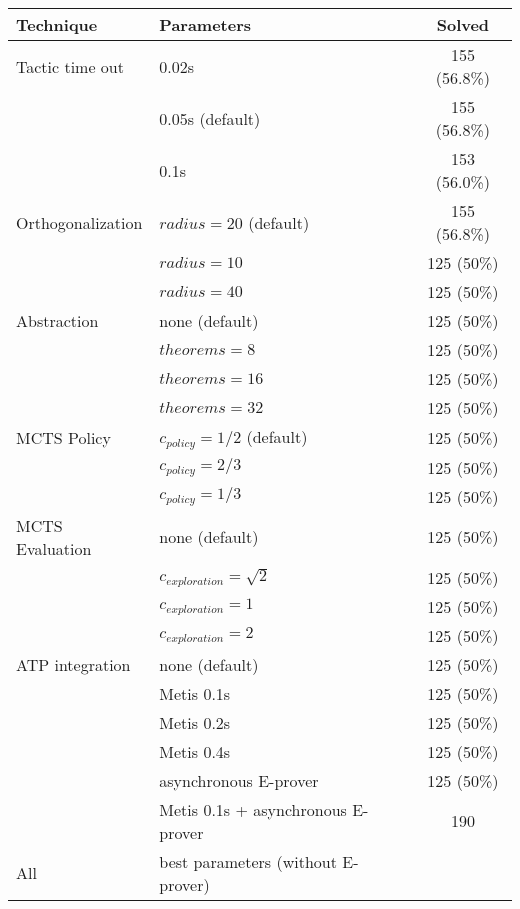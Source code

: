 \documentclass[runningheads,a4paper,draft]{svjour3}
\def\eprover{\textsf{E-prover}\xspace}
\def\metis{\textsf{Metis}\xspace}
\newcommand{\ra}[1]{\renewcommand{\arraystretch}{#1}}
\begin{document}
\begin{table}[ht]
\centering\ra{1.3}
\small
\begin{tabular}{llc}
\toprule
 Technique & Parameters & Solved \\
\midrule
Tactic time out & 0.02s & 155 (56.8\%)\\
                & 0.05s (default) & 155 (56.8\%)\\
                & 0.1s & 153 (56.0\%)\\
\midrule
Orthogonalization & $radius = 20$ (default) & 155 (56.8\%)\\ 
                  & $radius = 10$ & 125 (50\%)\\
                  & $radius = 40$ & 125 (50\%)\\
\midrule
Abstraction       & none (default) & 125 (50\%)\\
                  & $theorems = 8$ & 125 (50\%)\\
                  & $theorems = 16$ & 125 (50\%)\\
                  & $theorems = 32$ & 125 (50\%)\\
\midrule
MCTS Policy & $c_{policy} = 1/2$ (default) & 125 (50\%)\\
            & $c_{policy} = 2/3$ & 125 (50\%)\\
            & $c_{policy} = 1/3$ & 125 (50\%)\\
\midrule
MCTS Evaluation & none (default) & 125 (50\%) \\
           & $c_{exploration} =\sqrt{2}$ & 125 (50\%)\\ 
           & $c_{exploration} = 1$ & 125 (50\%)\\ 
           & $c_{exploration} = 2$ & 125 (50\%)\\ 
\midrule
ATP integration & none (default) & 125 (50\%)\\
                & \metis 0.1s & 125 (50\%)\\
                & \metis 0.2s & 125 (50\%)\\
                & \metis 0.4s & 125 (50\%)\\ 
                & asynchronous \eprover & 125 (50\%)\\
                & \metis 0.1s + asynchronous \eprover & 190\\
\midrule
All & best parameters (without \eprover) & \\ 
\bottomrule
\end{tabular}
\end{table}
\end{document}
